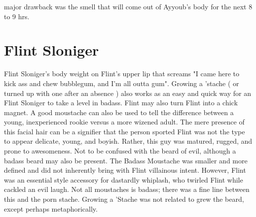 \documentclass[12pt]{book}
\begin{document}
major drawback was the smell that will come out of Ayyoub's body for the next 8 to 9 hrs.



\chapter{Flint Sloniger}

Flint Sloniger's body weight on Flint's upper lip that screams "I came here to kick ass and chew bubblegum, and I'm all outta gum". Growing a 'stache ( or turned up with one after an absence ) also works as an easy and quick way for an Flint Sloniger to take a level in badass. Flint may also turn Flint into a chick magnet. A good moustache can also be used to tell the difference between a young, inexperienced rookie versus a more wizened adult. The mere presence of this facial hair can be a signifier that the person sported Flint was not the type to appear delicate, young, and boyish. Rather, this guy was matured, rugged, and prone to awesomeness. Not to be confused with the beard of evil, although a badass beard may also be present. The Badass Moustache was smaller and more defined and did not inherently bring with Flint villainous intent. However, Flint was an essential style accessory for dastardly whiplash, who twirled Flint while cackled an evil laugh. Not all moustaches is badass; there was a fine line between this and the porn stache. Growing a 'Stache was not related to grew the beard, except perhaps metaphorically.
\end{document}
